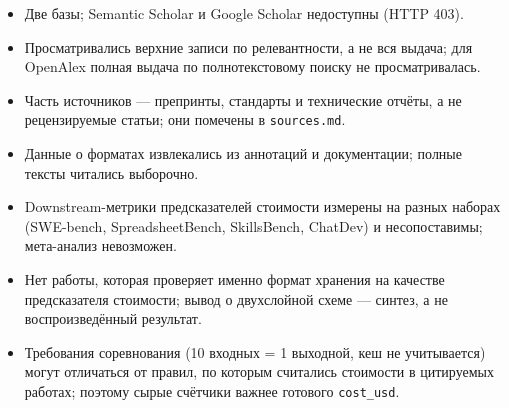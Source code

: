 \documentclass[11pt,a4paper]{article}
\begin{document}
\begin{itemize}
  \item Две базы; Semantic Scholar и Google Scholar недоступны (HTTP 403).
  \item Просматривались верхние записи по релевантности, а не вся выдача;
        для OpenAlex полная выдача по полнотекстовому поиску не
        просматривалась.
  \item Часть источников — препринты, стандарты и технические отчёты, а не
        рецензируемые статьи; они помечены в \texttt{sources.md}.
  \item Данные о форматах извлекались из аннотаций и документации; полные
        тексты читались выборочно.
  \item Downstream-метрики предсказателей стоимости измерены на разных
        наборах (SWE-bench, SpreadsheetBench, SkillsBench, ChatDev) и
        несопоставимы; мета-анализ невозможен.
  \item Нет работы, которая проверяет именно формат хранения на качестве
        предсказателя стоимости; вывод о двухслойной схеме — синтез, а не
        воспроизведённый результат.
  \item Требования соревнования (10 входных = 1 выходной, кеш не
        учитывается) могут отличаться от правил, по которым считались
        стоимости в цитируемых работах; поэтому сырые счётчики важнее
        готового \texttt{cost\_usd}.
\end{itemize}



\end{document}

